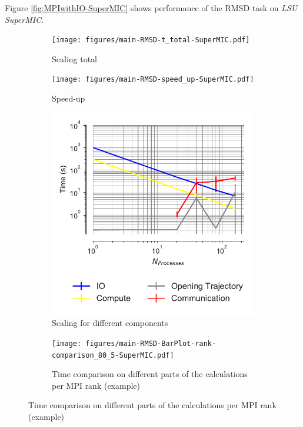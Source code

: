 Figure \ref{fig:MPIwithIO-SuperMIC} shows performance of the RMSD task on \emph{LSU SuperMIC}. 

\begin{figure}[!htb]
  \centering
  \begin{subfigure}{.4\textwidth}
    \texttt{[image: figures/main-RMSD-t\_total-SuperMIC.pdf]}
    \caption{Scaling total}
    \label{fig:MPIscaling-SuperMIC}
  \end{subfigure}
  \hfill
  \begin{subfigure}{.4\textwidth}
    \texttt{[image: figures/main-RMSD-speed\_up-SuperMIC.pdf]}
    \caption{Speed-up}
    \label{fig:MPIspeedup-SuperMIC}
  \end{subfigure}
  \bigskip

  \begin{subfigure}{.4\textwidth}
    \includegraphics[width=\linewidth]{figures/main-RMSD-time_comp_IO_comparison-SuperMIC.pdf}
    \captionsetup{format=hang}
    \caption{Scaling for different components}
    \label{fig:ScalingComputeIO-SuperMIC}
  \end{subfigure}
  \hfill
  \begin{subfigure} {.5\textwidth}
    \texttt{[image: figures/main-RMSD-BarPlot-rank-comparison\_80\_5-SuperMIC.pdf]}
    \captionsetup{format=hang}
    \caption{Time comparison on different parts of the calculations per MPI rank (example)}

\end{subfigure}
\end{figure}

